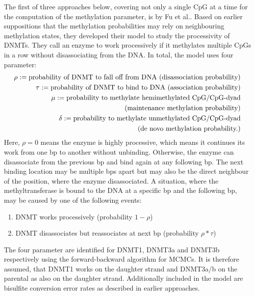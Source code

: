 The first of three approaches below, covering not only a single \ac{CpG} at a time for the computation of the methylation parameter, is by Fu et al.. Based on earlier suppositions that the methylation probabilities may rely on neighbouring methylation states, they developed their model to study the processivity of \acp{DNMT}. They call an enzyme to work processively if it methylates multiple \acp{CpG} in a row without disassociating from the DNA. In total, the model uses four parameter\cite{Fu}:
\begin{align}
\rho := \text{probability of DNMT to fall off from DNA (disassociation probability)}\\
\tau := \text{probability of DNMT to bind to DNA (association probability)}\\
\mu := \text{probability to methylate hemimethylated CpG/CpG-dyad}\notag\\
		\text{(maintenance methylation probability)}\\
\delta := \text{probability to methylate unmethylated CpG/CpG-dyad}\notag\\
		\text{(de novo methylation probability.)}
\label{parameters}
\end{align}
Here, $\rho = 0$ means the enzyme is highly processive, which means it continues its work from one \ac{bp} to another without unbinding. Otherwise, the enzyme can disassociate from the previous \ac{bp} and bind again at any following \ac{bp}. The next binding location may be multiple \acp{bp} apart but may also be the direct neighbour of the position, where the enzyme disassociated. A situation, where the methyltransferase is bound to the DNA at a specific \ac{bp} and the following \ac{bp}, may be caused by one of the following events\cite{Fu}:
\begin{enumerate}
\item \ac{DNMT} works processively (probability $1-\rho$)
\item \ac{DNMT} disassociates but reassociates at next \ac{bp} (probability $\rho * \tau$)
\end{enumerate}
The four parameter are identified for DNMT1, DNMT3a and DNMT3b respectively using the forward-backward algorithm for \acp{MCMC}. It is therefore assumed, that DNMT1 works on the daughter strand and DNMT3a/b on the parental as also on the daughter strand.\cite{Fu}\newline
Additionally included in the model are bisulfite conversion error rates as described in earlier approaches.\cite{Fu}\newline

